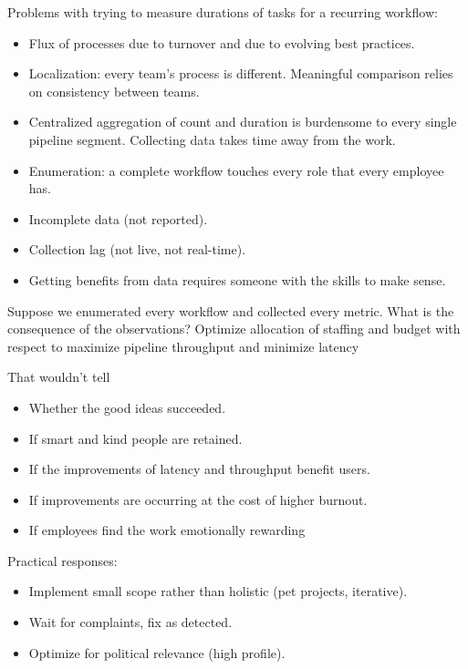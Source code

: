 Problems with trying to measure durations of tasks for a recurring workflow: 
\begin{itemize}
    \item Flux of processes due to turnover and due to evolving best practices.
    \item Localization: every team's process is different. Meaningful comparison relies on consistency between teams.
    \item Centralized aggregation of count and duration is burdensome to every single pipeline segment. Collecting data takes time away from the work.
    \item Enumeration: a complete workflow touches every role that every employee has.
    \item Incomplete data (not reported).
    \item Collection lag (not live, not real-time).
    \item Getting benefits from data requires someone with the skills to make sense.
\end{itemize}

Suppose we enumerated every workflow and collected every metric.
What is the consequence of the observations?
Optimize allocation of staffing and budget with respect to maximize pipeline throughput and minimize latency 

That wouldn't tell 
\begin{itemize}
    \item Whether the good ideas succeeded.
    \item If smart and kind people are retained.
    \item If the improvements of latency and throughput benefit users.
    \item If improvements are occurring at the cost of higher burnout.
    \item If employees find the work emotionally rewarding 
\end{itemize}


Practical responses: 
\begin{itemize}
    \item Implement small scope rather than holistic (pet projects, iterative).
    \item Wait for complaints, fix as detected.
    \item Optimize for political relevance (high profile).
\end{itemize}
